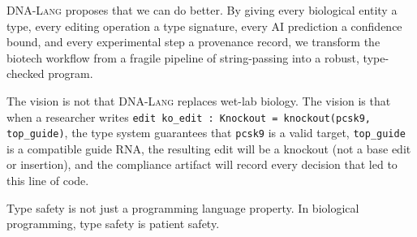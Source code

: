 \documentclass[12pt,a4paper]{article}
\newcommand{\DNALang}{\textsc{DNA-Lang}}
\begin{document}
\DNALang{} proposes that we can do better. By giving every biological entity a type, every editing operation a type signature, every AI prediction a confidence bound, and every experimental step a provenance record, we transform the biotech workflow from a fragile pipeline of string-passing into a robust, type-checked program.

The vision is not that \DNALang{} replaces wet-lab biology. The vision is that when a researcher writes \texttt{edit ko\_edit : Knockout = knockout(pcsk9, top\_guide)}, the type system guarantees that \texttt{pcsk9} is a valid target, \texttt{top\_guide} is a compatible guide RNA, the resulting edit will be a knockout (not a base edit or insertion), and the compliance artifact will record every decision that led to this line of code.

Type safety is not just a programming language property. In biological programming, type safety is patient safety.

\end{document}
